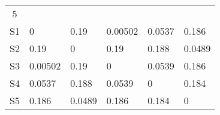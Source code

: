 \begin{tabular}{clllll}
  5\\
  S1 & 0 & 0.19 & 0.00502 & 0.0537 & 0.186\\
  S2 & 0.19 & 0 & 0.19 & 0.188 & 0.0489\\
  S3 & 0.00502 & 0.19 & 0 & 0.0539 & 0.186\\
  S4 & 0.0537 & 0.188 & 0.0539 & 0 & 0.184\\
  S5 & 0.186 & 0.0489 & 0.186 & 0.184 & 0\\
\end{tabular}
